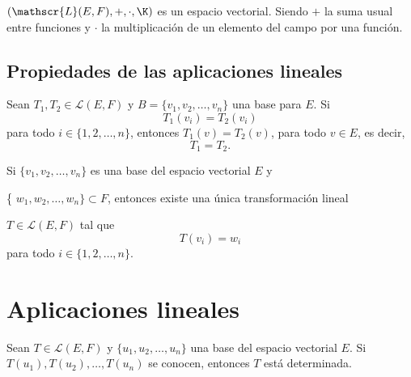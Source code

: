 \documentclass[compacto,10pt]{pubciencias-notas}
\begin{document}
\begin{teo}
    $(\mathscr{L}(E,F), +, \cdot, \K)$ es un espacio vectorial. Siendo $+$ la suma usual entre funciones y $\cdot$ la multiplicación de un elemento del campo por una función.
\end{teo}
\subsection{Propiedades de las aplicaciones lineales}

\begin{prop}
Sean $T_1,T_2 \in \mathscr{L}(E,F)$ y $B= \{v_1, v_2, \ldots, v_n\}$ una base para $E$. Si
\[
    T_1(v_i) = T_2(v_i)
\]
para todo $i \in \{1, 2, \ldots, n\}$, entonces $T_1(v)=T_2(v)$, para todo $v\in E$, es decir, 
\[
    T_1 = T_2.
\]
\end{prop}

\begin{prop}
Si $\{v_1, v_2, \ldots, v_n\}$ es una base del espacio vectorial $E$ y 

\noindent \{ $w_1, w_2, \ldots, w_n \} \subset F$, entonces existe una única transformación lineal

\noindent $T \in \mathscr{L}(E,F)$ tal que
\[
    T(v_i) = w_i
\]
para todo $i\in \{1, 2, \ldots, n\}$.
\end{prop}

\setcounter{section}{5}
\section{Aplicaciones lineales}
\setcounter{prop}{3}
\begin{prop}
    Sean $T \in \mathscr{L}(E,F)$ y $\{u_1,u_2,\ldots,u_n\}$ una base del espacio vectorial $E$. Si $T(u_1),T(u_2),\ldots,T(u_n)$ se conocen, entonces $T$ está determinada. %
\end{prop}
\end{document}
